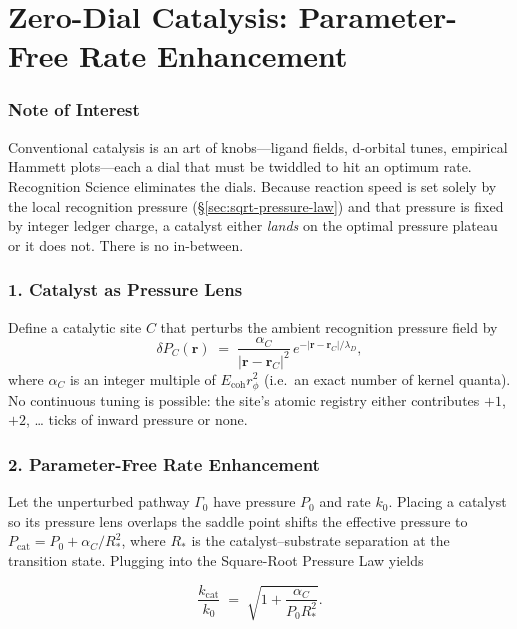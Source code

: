 \documentclass[11pt,oneside]{book}
\begin{document}
\bigskip

\section{Zero-Dial Catalysis: Parameter-Free Rate Enhancement}
\label{sec:zerodial-catalysis}

\subsubsection*{Note of Interest}

Conventional catalysis is an art of knobs—ligand fields, d-orbital tunes,
empirical Hammett plots—each a dial that must be twiddled to hit an
optimum rate.  
Recognition Science eliminates the dials.  
Because reaction speed is set solely by the local recognition pressure
(\S\;\ref{sec:sqrt-pressure-law}) and that pressure is fixed by integer
ledger charge, a catalyst either \emph{lands} on the optimal pressure
plateau or it does not.  
There is no in-between.

\subsubsection*{1. Catalyst as Pressure Lens}

Define a catalytic site \(C\) that perturbs the ambient recognition
pressure field by
\[
   \delta P_C(\mathbf r)
   \;=\;
   \frac{\alpha_C}{|\mathbf r-\mathbf r_C|^2}\,
   e^{-|\mathbf r-\mathbf r_C|/\lambda_D},
\]
where \(\alpha_C\) is an integer multiple of
\(E_{\text{coh}} r_\phi^2\)
(i.e.\ an exact number of kernel quanta).
No continuous tuning is possible: the site’s atomic registry either
contributes \(+1\), \(+2\), … ticks of inward pressure or none.

\subsubsection*{2. Parameter-Free Rate Enhancement}

Let the unperturbed pathway \(\Gamma_0\) have pressure \(P_0\) and rate
\(k_0\).  
Placing a catalyst so its pressure lens overlaps the saddle point shifts
the effective pressure to
\(P_\text{cat} = P_0 + \alpha_C / R_\ast^2\),
where \(R_\ast\) is the catalyst–substrate separation at the
transition state.  
Plugging into the Square-Root Pressure Law yields

\[
   \frac{k_\text{cat}}{k_0}
   \;=\;
   \sqrt{ 1 + \frac{\alpha_C}{P_0 R_\ast^2} }.
\]
\end{document}
